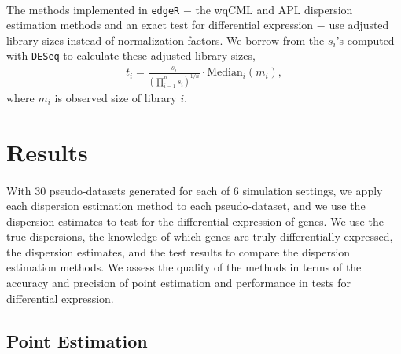 \documentclass[10pt]{article}
\begin{document}
\paragraph{} \indent The methods implemented in {\tt edgeR} $-$ the wqCML and APL dispersion estimation methods and an exact test for differential expression $-$ use adjusted library sizes instead of normalization factors. We borrow from the $s_i$'s computed with {\tt DESeq} to calculate these adjusted library sizes,
\begin{align*}
t_i = \frac{s_i}{ \left (\prod_{i = 1}^n s_i \right)^{1/n}} \cdot \text{Median}_i (m_i),
\end{align*} 
where $m_i$ is observed size of library $i$. 

\section*{Results}

\paragraph{} \indent With 30 pseudo-datasets generated for each of 6 simulation settings, we apply each dispersion estimation method to each pseudo-dataset, and we use the dispersion estimates to test for the differential expression of genes. We use the true dispersions, the knowledge of which genes are truly differentially expressed, the dispersion estimates, and the test results to compare the dispersion estimation methods. We assess the quality of the methods in terms of the accuracy and precision of point estimation and performance in tests for differential expression.

\subsection*{Point Estimation}

\end{document}
